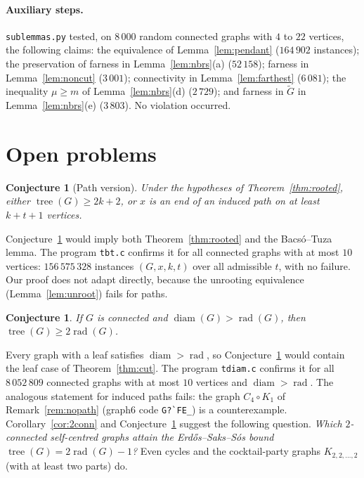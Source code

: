 \documentclass[11pt,a4paper]{article}
\newtheorem{conjecture}[theorem]{Conjecture}
\theoremstyle{definition}
\newcommand{\rad}{\operatorname{rad}}
\newcommand{\diam}{\operatorname{diam}}
\newcommand{\tr}{\operatorname{tree}}
\begin{document}
\paragraph{Auxiliary steps.} \texttt{sublemmas.py} tested, on $8\,000$ random connected graphs with $4$ to $22$ vertices, the following claims: the equivalence of Lemma~\ref{lem:pendant} ($164\,902$ instances); the preservation of farness in Lemma~\ref{lem:nbrs}(a) ($52\,158$); farness in Lemma~\ref{lem:noncut} ($3\,001$); connectivity in Lemma~\ref{lem:farthest} ($6\,081$); the inequality $\mu\ge m$ of Lemma~\ref{lem:nbrs}(d) ($2\,729$); and farness in $\tilde G$ in Lemma~\ref{lem:nbrs}(e) ($3\,803$). No violation occurred.

\section{Open problems}\label{sec:open}

\begin{conjecture}[Path version]\label{conj:path}
Under the hypotheses of Theorem~\ref{thm:rooted}, either $\tr(G)\ge2k+2$, or $x$ is an end of an induced path on at least $k+t+1$ vertices.
\end{conjecture}

Conjecture~\ref{conj:path} would imply both Theorem~\ref{thm:rooted} and the Bacs\'o--Tuza lemma. The program \texttt{tbt.c} confirms it for all connected graphs with at most $10$ vertices: $156\,575\,328$ instances $(G,x,k,t)$ over all admissible $t$, with no failure. Our proof does not adapt directly, because the unrooting equivalence (Lemma~\ref{lem:unroot}) fails for paths.

\begin{conjecture}\label{conj:sc}
If $G$ is connected and $\diam(G)>\rad(G)$, then $\tr(G)\ge2\rad(G)$.
\end{conjecture}

Every graph with a leaf satisfies $\diam>\rad$, so Conjecture~\ref{conj:sc} would contain the leaf case of Theorem~\ref{thm:cut}. The program \texttt{tdiam.c} confirms it for all $8\,052\,809$ connected graphs with at most $10$ vertices and $\diam>\rad$. The analogous statement for induced paths fails: the graph $C_4\circ K_1$ of Remark~\ref{rem:nopath} (graph6 code \verb|G?`FE_|) is a counterexample. Corollary~\ref{cor:2conn} and Conjecture~\ref{conj:sc} suggest the following question. \emph{Which $2$-connected self-centred graphs attain the Erd\H{o}s--Saks--S\'os bound $\tr(G)=2\rad(G)-1$?} Even cycles and the cocktail-party graphs $K_{2,2,\dots,2}$ (with at least two parts) do.
\end{document}
